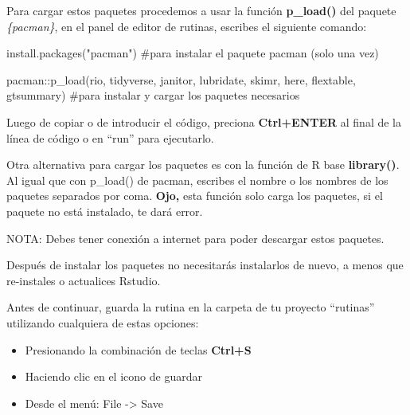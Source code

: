 \documentclass[
  letterpaper,
  DIV=11,
  numbers=noendperiod]{scrreprt}
\newenvironment{Shaded}{\begin{snugshade}}{\end{snugshade}}
\newcommand{\CommentTok}[1]{\textcolor[rgb]{0.37,0.37,0.37}{#1}}
\newcommand{\FunctionTok}[1]{\textcolor[rgb]{0.28,0.35,0.67}{#1}}
\newcommand{\NormalTok}[1]{\textcolor[rgb]{0.00,0.23,0.31}{#1}}
\newcommand{\SpecialCharTok}[1]{\textcolor[rgb]{0.37,0.37,0.37}{#1}}
\newcommand{\StringTok}[1]{\textcolor[rgb]{0.13,0.47,0.30}{#1}}
\begin{document}
Para cargar estos paquetes procedemos a usar la función
\textbf{p\_load()} del paquete \emph{\{pacman\}}, en el panel de editor
de rutinas, escribes el siguiente comando:

\begin{Shaded}
\begin{Highlighting}[]
\FunctionTok{install.packages}\NormalTok{(}\StringTok{"pacman"}\NormalTok{) }\CommentTok{\#para instalar el paquete pacman (solo una vez)}
\end{Highlighting}
\end{Shaded}

\begin{Shaded}
\begin{Highlighting}[]
\NormalTok{pacman}\SpecialCharTok{::}\FunctionTok{p\_load}\NormalTok{(rio, }
\NormalTok{               tidyverse, }
\NormalTok{               janitor, }
\NormalTok{               lubridate, }
\NormalTok{               skimr, }
\NormalTok{               here,}
\NormalTok{               flextable,}
\NormalTok{               gtsummary) }\CommentTok{\#para instalar y cargar los paquetes necesarios}
\end{Highlighting}
\end{Shaded}

Luego de copiar o de introducir el código, preciona \textbf{Ctrl+ENTER}
al final de la línea de código o en ``run'' para ejecutarlo.

Otra alternativa para cargar los paquetes es con la función de R base
\textbf{library()}. Al igual que con p\_load() de pacman, escribes el
nombre o los nombres de los paquetes separados por coma. \textbf{Ojo,}
esta función solo carga los paquetes, si el paquete no está instalado,
te dará error.

NOTA: Debes tener conexión a internet para poder descargar estos
paquetes.

Después de instalar los paquetes no necesitarás instalarlos de nuevo, a
menos que re-instales o actualices Rstudio.

Antes de continuar, guarda la rutina en la carpeta de tu proyecto
``rutinas'' utilizando cualquiera de estas opciones:

\begin{itemize}
\item
  Presionando la combinación de teclas \textbf{Ctrl+S}
\item
  Haciendo clic en el icono de guardar
\item
  Desde el menú: File -\textgreater{} Save
\end{itemize}
\end{document}
